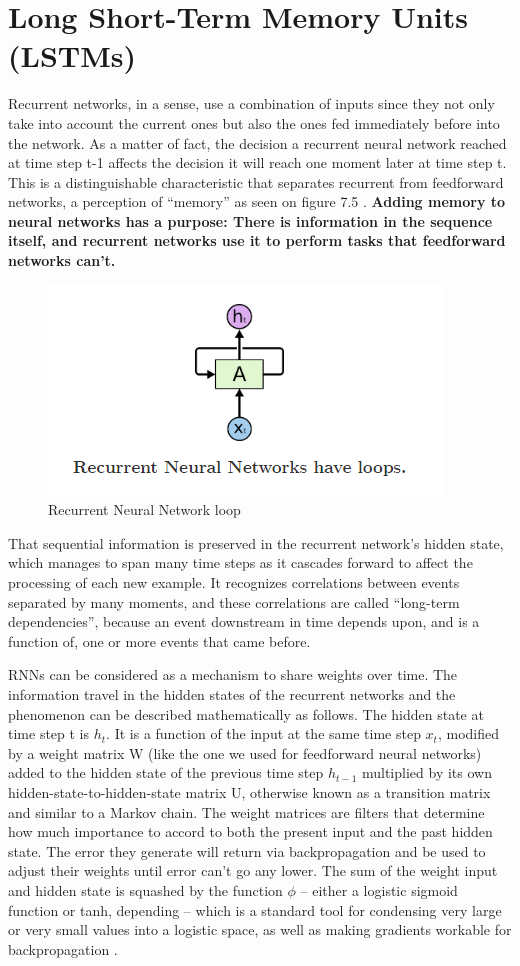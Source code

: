 \section{Long Short-Term Memory Units (LSTMs)}
Recurrent networks, in a sense, use a combination of inputs since they not only take into account the current ones but also the ones fed immediately before into the network. As a matter of fact, the decision a recurrent neural network reached at time step t-1 affects the decision it will reach one moment later at time step t. This is a distinguishable characteristic that separates recurrent from feedforward networks, a perception of “memory” as seen on figure 7.5 \cite{olah2015understanding}. \textbf{Adding memory to neural networks has a purpose: There is information in the sequence itself, and recurrent networks use it to perform tasks that feedforward networks can’t.}
\begin{figure}[h!]
\centering
\includegraphics[width=0.7\linewidth]{project/rnn2.png}
\caption{Recurrent Neural Network loop}
\label{fig:felix}
\end{figure}
That sequential information is preserved in the recurrent network’s hidden state, which manages to span many time steps as it cascades forward to affect the processing of each new example. It recognizes correlations between events separated by many moments, and these correlations are called “long-term dependencies”, because an event downstream in time depends upon, and is a function of, one or more events that came before. 
\par RNNs can be considered as a mechanism to share weights over time. The information travel in the hidden states of the recurrent networks and the phenomenon can be described mathematically as follows. The hidden state at time step t is $h_{t}$. It is a function of the input at the same time step $x_{t}$, modified by a weight matrix W (like the one we used for feedforward neural networks) added to the hidden state of the previous time step $h_{t-1}$ multiplied by its own hidden-state-to-hidden-state matrix U, otherwise known as a transition matrix and similar to a Markov chain. The weight matrices are filters that determine how much importance to accord to both the present input and the past hidden state. The error they generate will return via backpropagation and be used to adjust their weights until error can’t go any lower. The sum of the weight input and hidden state is squashed by the function $\phi$ – either a logistic sigmoid function or tanh, depending – which is a standard tool for condensing very large or very small values into a logistic space, as well as making gradients workable for backpropagation \cite{palchak2013artificial}.
